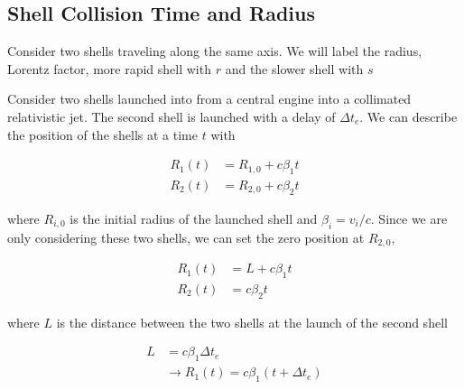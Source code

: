 \documentclass[linenumbers]{aastex631}
\begin{document}




\newpage




\begin{appendix}
\section{Shell Collision Time and Radius}

Consider two shells traveling along the same axis. We will label the radius, Lorentz factor,  more rapid shell with $r$ and the slower shell with $s$

Consider two shells launched into from a central engine into a collimated relativistic jet. The second shell is launched with a delay of $\Delta t_e$. We can describe the position of the shells at a time $t$ with

\begin{align}
	R_1(t) &= R_{1,0} + c\beta_1 t \\
	R_2(t) &= R_{2,0} + c\beta_2 t
\end{align}

where $R_{i,0}$ is the initial radius of the launched shell and $\beta_i = v_i/c$. Since we are only considering these two shells, we can set the zero position at $R_{2,0}$, 

\begin{align}
	R_1(t) &= L + c\beta_1 t \\
	R_2(t) &= c\beta_2 t
\end{align}

where $L$ is the distance between the two shells at the launch of the second shell

\begin{align}
	L &= c\beta_1 \Delta t_e\\ 
	&\rightarrow R_1(t) = c\beta_1(t+\Delta t_e)
\end{align}


\end{appendix}
\end{document}
